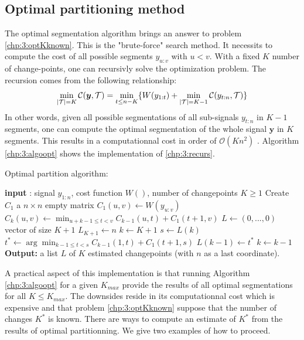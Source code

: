 \subsection{Optimal partitioning method}

The optimal segmentation algorithm brings an answer to problem \ref{chp:3:optKknown}. This is the "brute-force" search method. It necessits to compute the cost of all possible segments $y_{u:v}$ with $u<v$.  With a fixed $K$ number of change-points, one can recursivly solve the optimization problem. The recursion comes from the following relationship: 
\begin{equation}\label{chp:3:recurs}
\min_{\lvert{\mathcal T}\rvert = K}\mathcal{C}(\bm y, {\mathcal T}) = \min_{t \leq n-K}\{W(y_{1:t})+\min_{\lvert{\mathcal T}\rvert = K-1}\mathcal{C}(y_{t:n},{\mathcal T})\} 
\end{equation}
In other words, given all possible segmentations of all sub-signals $y_{t:n}$ in $K-1$ segments, one can compute the optimal segmentation of the whole signal $\bm y$ in $K$ segments. This results in a computationnal cost in order of $\mathcal{O}(Kn^2)$ \cite{haynes2017}. Algorithm \ref{chp:3:algoopt} shows the implementation of \ref{chp:3:recurs}. 

\begin{algorithm}[ht]
\caption{Optimal partition algorithm:}\label{chp:3:algoopt}
\begin{algorithmic}

\State \textbf{input} : signal $y_{1:n}$, cost function $W()$, number of changepoints $K \geq 1$
\State Create $C_1$ a $n\times n$ empty matrix
  \State $C_1(u,v) \gets W(y_{u:v})$
\EndFor
{}
      \State $C_k(u,v) \gets \min_{u+k-1 \leq t < v} C_{k-1}(u,t) + C_1(t+1,v)$ 
    \EndFor
  \EndFor
\EndIf
\State $L \gets (0,...,0)$ vector of size $K+1$
\State $L_{K+1} \gets n$
\State $k \gets K+1$
  \State $s \gets L(k)$
  \State $t^* \gets \arg\min_{k-1\leq t < s}C_{k-1}(1,t)+C_1(t+1,s)$
  \State $L(k-1) \gets t^*$
  \State $k \gets k-1$
\EndWhile
\State \textbf{Output:} a list $L$ of $K$ estimated changepoints (with $n$ as a last coordinate).
\end{algorithmic}
\end{algorithm} 

A practical aspect of this implementation is that running Algorithm \ref{chp:3:algoopt} for a given $K_{max}$ provide the results of all optimal segmentations for all $K \leq K_{max}$. The downsides reside in its computationnal cost which is expensive and that problem \ref{chp:3:optKknown} suppose that the number of changes $K^*$ is known. There are ways to compute an estimate of $K^*$ from the results of optimal partitionning. We give two examples of how to proceed.

